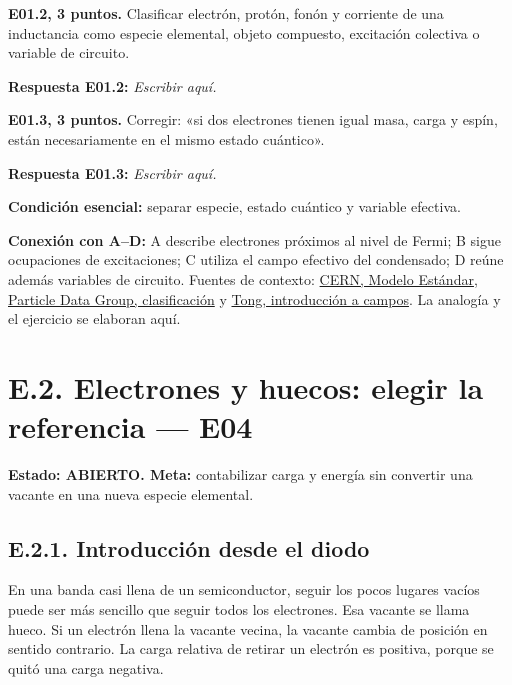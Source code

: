\documentclass[
  spanish,
  10pt,
  a4paper,
]{article}
\begin{document}

\textbf{E01.2, 3 puntos.} Clasificar electrón, protón, fonón y corriente
de una inductancia como especie elemental, objeto compuesto, excitación
colectiva o variable de circuito.

\textbf{Respuesta E01.2:} \emph{Escribir aquí.}


\textbf{E01.3, 3 puntos.} Corregir: «si dos electrones tienen igual
masa, carga y espín, están necesariamente en el mismo estado cuántico».

\textbf{Respuesta E01.3:} \emph{Escribir aquí.}

\textbf{Condición esencial:} separar especie, estado cuántico y variable
efectiva.

\textbf{Conexión con A--D:} A describe electrones próximos al nivel de
Fermi; B sigue ocupaciones de excitaciones; C utiliza el campo efectivo
del condensado; D reúne además variables de circuito. Fuentes de
contexto: \href{https://home.cern/science/physics/standard-model/}{CERN,
Modelo Estándar},
\href{https://pdg.lbl.gov/chris/museum_version/standard_model.html}{Particle
Data Group, clasificación} y
\href{https://www.damtp.cam.ac.uk/user/tong/qft/qfthtml/S0.html}{Tong,
introducción a campos}. La analogía y el ejercicio se elaboran aquí.


\section{E.2. Electrones y huecos: elegir la referencia ---
E04}\label{e.2.-electrones-y-huecos-elegir-la-referencia-e04}

\textbf{Estado: ABIERTO. Meta:} contabilizar carga y energía sin
convertir una vacante en una nueva especie elemental.

\subsection{E.2.1. Introducción desde el
diodo}\label{e.2.1.-introducciuxf3n-desde-el-diodo}

En una banda casi llena de un semiconductor, seguir los pocos lugares
vacíos puede ser más sencillo que seguir todos los electrones. Esa
vacante se llama hueco. Si un electrón llena la vacante vecina, la
vacante cambia de posición en sentido contrario. La carga relativa de
retirar un electrón es positiva, porque se quitó una carga negativa.
\end{document}

